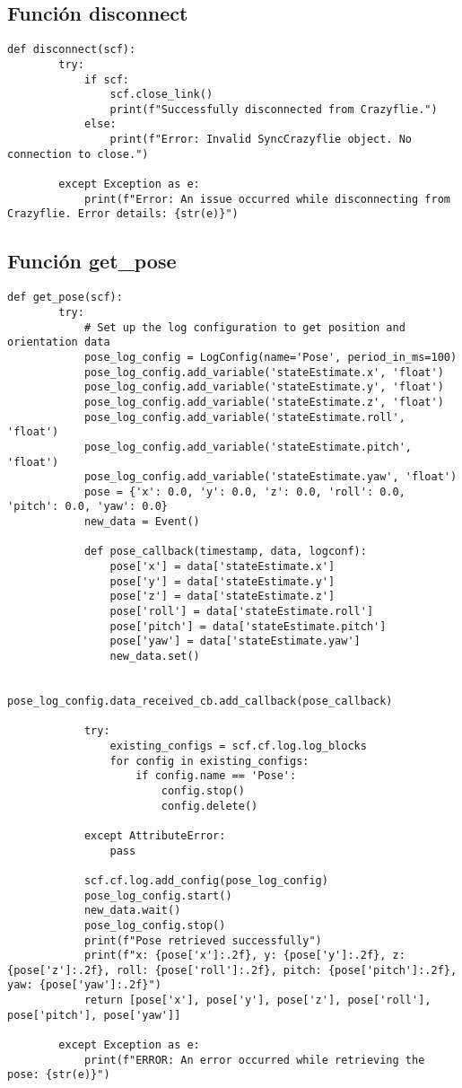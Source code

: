 \subsection{Función disconnect}
\begin{lstlisting}[caption=Función en Python para cerrar la conexión con Crazyflie., label=code:funcion_disconnect]
	def disconnect(scf):
		try:
			if scf:
				scf.close_link()
				print(f"Successfully disconnected from Crazyflie.")
			else:
				print(f"Error: Invalid SyncCrazyflie object. No connection to close.")
				
		except Exception as e:
			print(f"Error: An issue occurred while disconnecting from Crazyflie. Error details: {str(e)}")
\end{lstlisting}

\newpage
\subsection{Función get\_pose}
\begin{lstlisting}[caption=Función en Python para obtener la pose actual del Crazyflie., label=code:funcion_get_pose]
	def get_pose(scf):
		try:
			# Set up the log configuration to get position and orientation data
			pose_log_config = LogConfig(name='Pose', period_in_ms=100)
			pose_log_config.add_variable('stateEstimate.x', 'float')
			pose_log_config.add_variable('stateEstimate.y', 'float')
			pose_log_config.add_variable('stateEstimate.z', 'float')
			pose_log_config.add_variable('stateEstimate.roll', 'float')
			pose_log_config.add_variable('stateEstimate.pitch', 'float')
			pose_log_config.add_variable('stateEstimate.yaw', 'float')
			pose = {'x': 0.0, 'y': 0.0, 'z': 0.0, 'roll': 0.0, 'pitch': 0.0, 'yaw': 0.0}
			new_data = Event()
			
			def pose_callback(timestamp, data, logconf):
				pose['x'] = data['stateEstimate.x']
				pose['y'] = data['stateEstimate.y']
				pose['z'] = data['stateEstimate.z']
				pose['roll'] = data['stateEstimate.roll']
				pose['pitch'] = data['stateEstimate.pitch']
				pose['yaw'] = data['stateEstimate.yaw']
				new_data.set()
			
			pose_log_config.data_received_cb.add_callback(pose_callback)
			
			try:
				existing_configs = scf.cf.log.log_blocks
				for config in existing_configs:
					if config.name == 'Pose':
						config.stop()
						config.delete()
						
			except AttributeError:
				pass  
				
			scf.cf.log.add_config(pose_log_config)
			pose_log_config.start()
			new_data.wait()
			pose_log_config.stop()
			print(f"Pose retrieved successfully")
			print(f"x: {pose['x']:.2f}, y: {pose['y']:.2f}, z: {pose['z']:.2f}, roll: {pose['roll']:.2f}, pitch: {pose['pitch']:.2f}, yaw: {pose['yaw']:.2f}")
			return [pose['x'], pose['y'], pose['z'], pose['roll'], pose['pitch'], pose['yaw']]
		
		except Exception as e:
			print(f"ERROR: An error occurred while retrieving the pose: {str(e)}")
\end{lstlisting}

